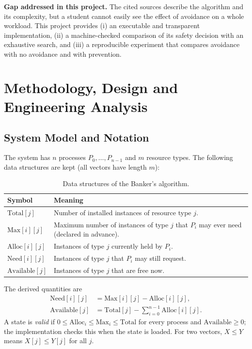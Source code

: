 \documentclass[11pt,a4paper]{report}
\begin{document}
\textbf{Gap addressed in this project.} The cited sources describe the algorithm and its complexity, but a student cannot easily see the effect of avoidance on a whole workload. This project provides (i) an executable and transparent implementation, (ii) a machine-checked comparison of its safety decision with an exhaustive search, and (iii) a reproducible experiment that compares avoidance with no avoidance and with prevention.

\section{Methodology, Design and Engineering Analysis}
\label{sec:method}
\subsection{System Model and Notation}
The system has $n$ processes $P_0,\dots,P_{n-1}$ and $m$ resource types. The following data structures are kept (all vectors have length $m$):

\begin{table}[h!]
\centering
\caption{Data structures of the Banker's algorithm.}
\renewcommand{\arraystretch}{1.25}
\begin{tabular}{|l|p{11cm}|}
\hline
\textbf{Symbol} & \textbf{Meaning} \\ \hline
$\text{Total}[j]$ & Number of installed instances of resource type $j$. \\ \hline
$\text{Max}[i][j]$ & Maximum number of instances of type $j$ that $P_i$ may ever need (declared in advance). \\ \hline
$\text{Alloc}[i][j]$ & Instances of type $j$ currently held by $P_i$. \\ \hline
$\text{Need}[i][j]$ & Instances of type $j$ that $P_i$ may still request. \\ \hline
$\text{Available}[j]$ & Instances of type $j$ that are free now. \\ \hline
\end{tabular}
\end{table}

The derived quantities are
\begin{align}
\text{Need}[i][j] &= \text{Max}[i][j] - \text{Alloc}[i][j], \label{eq:need}\\
\text{Available}[j] &= \text{Total}[j] - \sum_{i=0}^{n-1} \text{Alloc}[i][j]. \label{eq:avail}
\end{align}
A state is \emph{valid} if $0 \le \text{Alloc}_i \le \text{Max}_i \le \text{Total}$ for every process and $\text{Available} \ge 0$; the implementation checks this when the state is loaded. For two vectors, $X \le Y$ means $X[j] \le Y[j]$ for all $j$.
\end{document}
